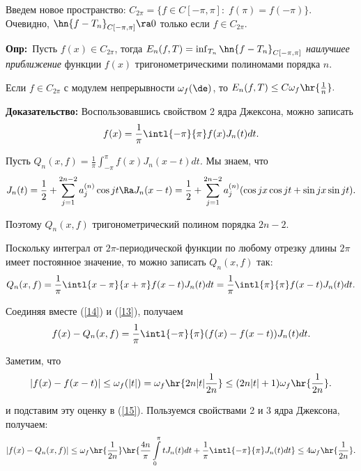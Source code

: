 \documentclass[a4paper]{article}
\def\defin{\noindent\textbf{Опр:}\ }
\begin{document}
\medskip Введем новое пространство: $C_{2\pi}=\{f\in
C[-\pi,\pi]:\;f(\pi)=f(-\pi)\}.$ Очевидно,
$\hn{f-T_n}_{C[-\pi,\pi]}\ra 0$ только если $f\in
C_{2\pi}.$

\defin Пусть $f(x)\in C_{2\pi}$, тогда $E_n(f,T)=\inf_{T_n}\hn{f-T_n}_{C[-\pi,\pi]}$ \emph{наилучшее приближение} функции $f(x)$ тригонометрическими полиномами порядка $n.$

\begin{theorems}[Джексона] Если $f\in C_{2\pi}$ с модулем непрерывности $\omega_f(\de)$, то $E_n(f,T)\le
C\omega_f\hr{\frac1n}.$
\end{theorems}
\textbf{Доказательство:} Воспользовавшись свойством 2 ядра
Джексона, можно записать
\begin{equation}\label{14}
f(x)=\frac1{\pi}\intl{-\pi}{\pi}f(x)J_n(t)dt.
\end{equation}

Пусть $Q_n(x,f)=\frac1{\pi}\int_{-\pi}^{\pi}f(x)J_n(x-t)dt.$ Мы
знаем, что
$$J_n(t)=\frac12+\sum_{j=1}^{2n-2}a_j^{(n)}\cos jt\Ra
J_n(x-t)=\frac12+\sum_{j=1}^{2n-2}a_j^{(n)}(\cos jx\cos jt+\sin
jx\sin jt).$$

Поэтому $Q_n(x,f)$ тригонометрический полином порядка $2n-2.$

Поскольку интеграл от $2\pi$-периодической функции по любому
отрезку длины $2\pi$ имеет постоянное значение, то можно записать
$Q_n(x,f)$ так:
\begin{equation}\label{13}
Q_n(x,f)=\frac1{\pi}\intl{x-\pi}{x+\pi}f(x-t)J_n(t)dt=\frac1{\pi}\intl{\pi}{\pi}f(x-t)J_n(t)dt.
\end{equation}

Соединяя вместе (\ref{14}) и (\ref{13}), получаем
\begin{equation}\label{15}
f(x)-Q_n(x,f)=\frac1{\pi}\intl{-\pi}{\pi}(f(x)-f(x-t))J_n(t)dt.
\end{equation}

Заметим, что
\begin{equation*}
|f(x)-f(x-t)|\le\omega_f(|t|)=\omega_f\hr{2n|t|\frac1{2n}}\le(2n|t|+1)\omega_f\hr{\frac1{2n}}.
\end{equation*}

и подставим эту оценку в (\ref{15}). Пользуемся свойствами 2 и 3
ядра Джексона, получаем:
\begin{equation*}
|f(x)-Q_n(x,f)|\le\omega_f\hr{\frac1{2n}}\hr{\frac{4n}{\pi}\int\limits_0^{\pi}tJ_n(t)dt+\frac1{\pi}\intl{-\pi}{\pi}J_n(t)dt}\le4\omega_f\hr{\frac1{2n}}.
\end{equation*}
\end{document}
